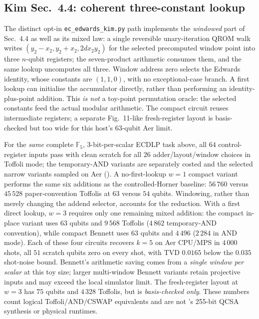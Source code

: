 \documentclass[11pt]{article}
\newcommand{\code}[1]{\texttt{#1}}
\theoremstyle{plain}
\theoremstyle{remark}
\begin{document}
\subsection{Kim Sec.~4.4: coherent three-constant lookup}
\label{ec:sec:kim-edwards-qrom}

The distinct opt-in \code{ec\_edwards\_kim.py} path implements the
\emph{windowed} part of \cite{ec:kim26} Sec.~4.4 as well as its mixed law:
a single reversible unary-iteration QROM walk writes
$(y_2-x_2,y_2+x_2,2dx_2y_2)$ for the selected precomputed window point
into three $n$-qubit registers; the seven-product arithmetic consumes them,
and the same lookup uncomputes all three. Window address zero selects the
Edwards identity, whose constants are $(1,1,0)$, with no exceptional-case
branch. A first lookup can initialise the accumulator directly, rather than
performing an identity-plus-point addition. This \emph{is not} a toy-point
permutation oracle: the selected constants feed the actual modular
arithmetic. The compact circuit reuses intermediate registers; a separate
Fig.~11-like fresh-register layout is basis-checked but too wide for this
host's $63$-qubit Aer limit.

For the \emph{same} complete $\mathbb F_5$, $3$-bit-per-scalar ECDLP task above,
all $64$ control-register inputs pass with clean scratch for all $26$
adder/layout/window choices in Toffoli mode; the temporary-AND variants
are separately costed and the selected narrow variants sampled on Aer
(). A no-first-lookup $w=1$ compact
variant performs the same six additions as the controlled-Horner baseline:
$56\,760$ versus $45\,528$ paper-convention Toffolis at $63$ versus
$54$ qubits. Windowing, rather than merely changing the addend selector,
accounts for the reduction. With a first direct lookup, $w=3$ requires
only one remaining mixed addition: the compact in-place variant uses
$63$ qubits and $9\,568$ Toffolis ($4\,862$ temporary-AND convention),
while compact Bennett uses $63$ qubits and $4\,496$ ($2\,284$ in AND
mode). Each of these four circuits recovers $k=5$ on Aer CPU/MPS in
$4\,000$ shots, all $51$ scratch qubits zero on every shot, with TVD
$0.0165$ below the $0.035$ shot-noise bound. Bennett's arithmetic saving
comes from a \emph{single window per scalar} at this toy size; larger
multi-window Bennett variants retain projective inputs and may exceed
the local simulator limit. The fresh-register layout at $w=3$ has
$75$ qubits and $4\,328$ Toffolis, but is \emph{basis-checked only}.
These numbers count logical Toffoli/AND/CSWAP equivalents and are not
\cite{ec:kim26}'s 255-bit QCSA synthesis or physical runtimes.
\end{document}
